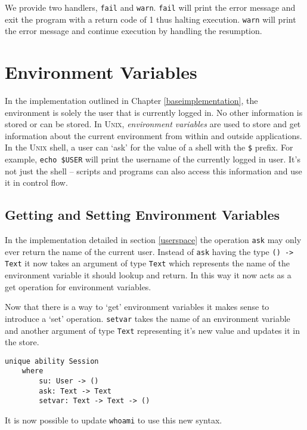 \documentclass[logo,bsc,singlespacing,parskip]{infthesis}
\begin{document}
We provide two handlers, \texttt{fail} and \texttt{warn}. \texttt{fail} will
print the error message and exit the program with a return code of 1 thus
halting execution. \texttt{warn} will print the error message and continue
execution by handling the resumption.

\section{Environment Variables}

In the implementation outlined in Chapter \ref{baseimplementation}, the
environment is solely the user that is currently logged in. No other
information is stored or can be stored. In \textsc{Unix}, \emph{environment
variables} are used to store and get information about the current environment
from within and outside applications. In the \textsc{Unix} shell, a user can
`ask' for the value of a shell with the \texttt{\$} prefix. For example,
\texttt{echo \$USER} will print the username of the currently logged in user.
It's not just the shell -- scripts and programs can also access this
information and use it in control flow.

\subsection{Getting and Setting Environment Variables}

In the implementation detailed in section \ref{userspace} the operation
\texttt{ask} may only ever return the name of the current user. Instead of
\texttt{ask} having the type \texttt{() -> Text} it now takes an argument of
type \texttt{Text} which represents the name of the environment variable it
should lookup and return. In this way it now acts as a get operation for
environment variables. 

Now that there is a way to `get' environment variables
it makes sense to introduce a `set' operation. \texttt{setvar} takes the name
of an environment variable and another argument of type \texttt{Text}
representing it's new value and updates it in the store.

\begin{lstlisting}[language=unison]
unique ability Session
    where
        su: User -> ()
        ask: Text -> Text
        setvar: Text -> Text -> ()
\end{lstlisting}

It is now possible to update \texttt{whoami} to use this new syntax.
\end{document}
